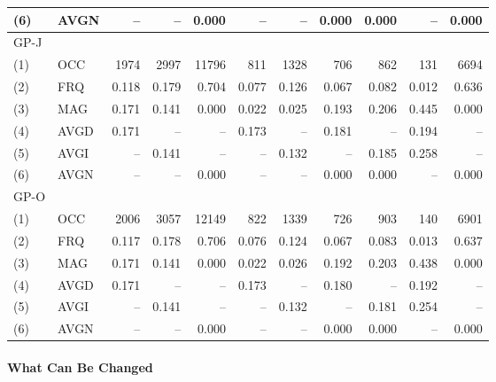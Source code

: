 \begin{table}[H]
\begin{tabular}{llrrrrrrrrr}
		(6)  & AVGN &    -- &    -- & 0.000 &    -- &    -- & 0.000 & 0.000 &    -- &  0.000 \\ \hline
		GP-J &      &       &       &       &       &       &       &       &       &        \\
		(1)  & OCC  &  1974 &  2997 & 11796 &   811 &  1328 &   706 &   862 &   131 &   6694 \\
		(2)  & FRQ  & 0.118 & 0.179 & 0.704 & 0.077 & 0.126 & 0.067 & 0.082 & 0.012 &  0.636 \\
		(3)  & MAG  & 0.171 & 0.141 & 0.000 & 0.022 & 0.025 & 0.193 & 0.206 & 0.445 &  0.000 \\
		(4)  & AVGD & 0.171 &    -- &    -- & 0.173 &    -- & 0.181 &    -- & 0.194 &     -- \\
		(5)  & AVGI &    -- & 0.141 &    -- &    -- & 0.132 &    -- & 0.185 & 0.258 &     -- \\
		(6)  & AVGN &    -- &    -- & 0.000 &    -- &    -- & 0.000 & 0.000 &    -- &  0.000 \\ \hline
		GP-O &      &       &       &       &       &       &       &       &       &        \\
		(1)  & OCC  &  2006 &  3057 & 12149 &   822 &  1339 &   726 &   903 &   140 &   6901 \\
		(2)  & FRQ  & 0.117 & 0.178 & 0.706 & 0.076 & 0.124 & 0.067 & 0.083 & 0.013 &  0.637 \\
		(3)  & MAG  & 0.171 & 0.141 & 0.000 & 0.022 & 0.026 & 0.192 & 0.203 & 0.438 &  0.000 \\
		(4)  & AVGD & 0.171 &    -- &    -- & 0.173 &    -- & 0.180 &    -- & 0.192 &     -- \\
		(5)  & AVGI &    -- & 0.141 &    -- &    -- & 0.132 &    -- & 0.181 & 0.254 &     -- \\
		(6)  & AVGN &    -- &    -- & 0.000 &    -- &    -- & 0.000 & 0.000 &    -- &  0.000 \\ \hline\hline
	\end{tabular}
\end{table}

\paragraph{What Can Be Changed}

